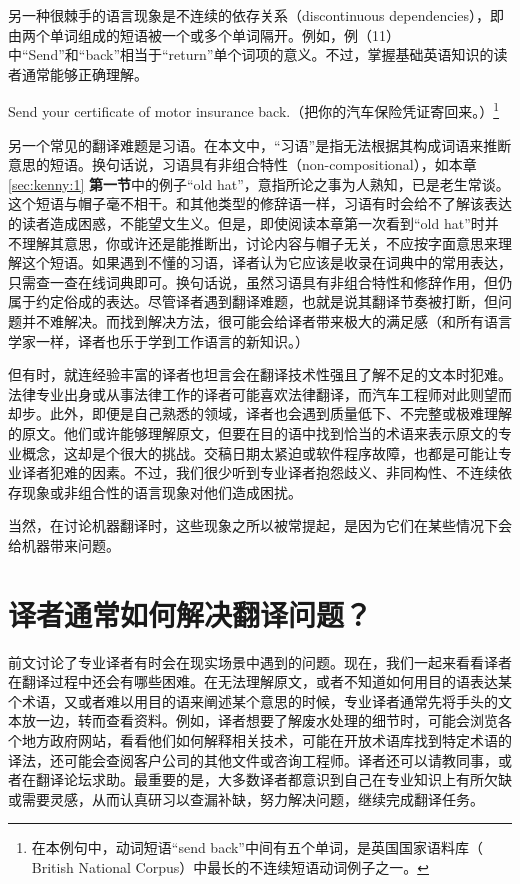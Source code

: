 \documentclass[output=paper]{langscibook}
\begin{document}
另一种很棘手的语言现象是不连续的依存关系（discontinuous dependencies），即由两个单词组成的短语被一个或多个单词隔开。例如，例（11）中“Send”和“back”相当于“return”单个词项的意义。不过，掌握基础英语知识的读者通常能够正确理解。

\ea
Send your certificate of motor insurance back.（把你的汽车保险凭证寄回来。）\footnote{在本例句中，动词短语“send back”中间有五个单词，是英国国家语料库（ British National Corpus）中最长的不连续短语动词例子之一。}
\z

另一个常见的翻译难题是习语。在本文中，“习语”是指无法根据其构成词语来推断意思的短语。换句话说，习语具有非组合特性（non-compositional），如本章\ref{sec:kenny:1} \textbf{第一节}中的例子“old hat”，意指所论之事为人熟知，已是老生常谈。这个短语与帽子毫不相干。和其他类型的修辞语一样，习语有时会给不了解该表达的读者造成困惑，不能望文生义。但是，即使阅读本章第一次看到“old hat”时并不理解其意思，你或许还是能推断出，讨论内容与帽子无关，不应按字面意思来理解这个短语。如果遇到不懂的习语，译者认为它应该是收录在词典中的常用表达，只需查一查在线词典即可。换句话说，虽然习语具有非组合特性和修辞作用，但仍属于约定俗成的表达。尽管译者遇到翻译难题，也就是说其翻译节奏被打断，但问题并不难解决。而找到解决方法，很可能会给译者带来极大的满足感（和所有语言学家一样，译者也乐于学到工作语言的新知识。）

但有时，就连经验丰富的译者也坦言会在翻译技术性强且了解不足的文本时犯难。法律专业出身或从事法律工作的译者可能喜欢法律翻译，而汽车工程师对此则望而却步。此外，即便是自己熟悉的领域，译者也会遇到质量低下、不完整或极难理解的原文。他们或许能够理解原文，但要在目的语中找到恰当的术语来表示原文的专业概念，这却是个很大的挑战。交稿日期太紧迫或软件程序故障，也都是可能让专业译者犯难的因素。不过，我们很少听到专业译者抱怨歧义、非同构性、不连续依存现象或非组合性的语言现象对他们造成困扰。

当然，在讨论机器翻译时，这些现象之所以被常提起，是因为它们在某些情况下会给机器带来问题。

\section{译者通常如何解决翻译问题？}
前文讨论了专业译者有时会在现实场景中遇到的问题。现在，我们一起来看看译者在翻译过程中还会有哪些困难。在无法理解原文，或者不知道如何用目的语表达某个术语，又或者难以用目的语来阐述某个意思的时候，专业译者通常先将手头的文本放一边，转而查看资料。例如，译者想要了解废水处理的细节时，可能会浏览各个地方政府网站，看看他们如何解释相关技术，可能在开放术语库找到特定术语的译法，还可能会查阅客户公司的其他文件或咨询工程师。译者还可以请教同事，或者在翻译论坛求助。最重要的是，大多数译者都意识到自己在专业知识上有所欠缺或需要灵感，从而认真研习以查漏补缺，努力解决问题，继续完成翻译任务。
\end{document}
